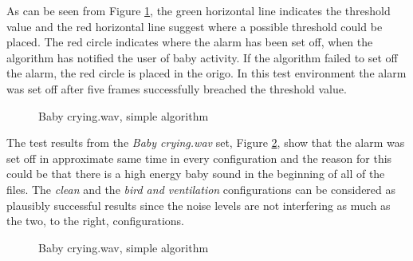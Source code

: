 As can be seen from Figure \ref{fig:bc1_simp_crop}, the green horizontal line indicates the threshold value and the red horizontal line
suggest where a possible threshold could be placed. The red circle indicates where the alarm has been set off, when the algorithm has
notified the user of baby activity. If the algorithm failed to set off the alarm, the red circle is placed in the origo. In this test 
environment the alarm was set off after five frames successfully breached the threshold value.

\begin{figure}[H]
  \centering
  \caption{Baby crying.wav, simple algorithm}
  \label{fig:bc1_simp_crop}
\end{figure}

The test results from the \emph{Baby crying.wav} set, Figure \ref{fig:bc1_simp}, show that the alarm was set off in approximate same time 
in every configuration and the reason for this could be that there is a high energy baby sound in the beginning of all of the 
files. The \emph{clean} and the \emph{bird and ventilation} configurations can be considered as plausibly successful results since the 
noise levels are not interfering as much as the two, to the right, configurations.

\begin{figure}[H]
  \centering
  \caption{Baby crying.wav, simple algorithm}
  \label{fig:bc1_simp}
\end{figure}

